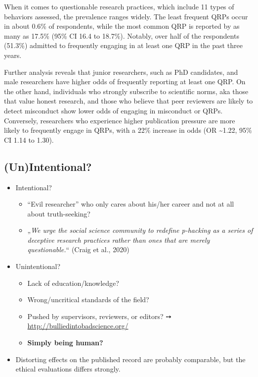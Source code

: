 \documentclass[
  letterpaper,
  DIV=11,
  numbers=noendperiod]{scrartcl}
\providecommand{\tightlist}{%
  \setlength{\itemsep}{0pt}\setlength{\parskip}{0pt}}
\begin{document}
When it comes to questionable research practices, which include 11 types
of behaviors assessed, the prevalence ranges widely. The least frequent
QRPs occur in about 0.6\% of respondents, while the most common QRP is
reported by as many as 17.5\% (95\% CI 16.4 to 18.7\%). Notably, over
half of the respondents (51.3\%) admitted to frequently engaging in at
least one QRP in the past three years.

Further analysis reveals that junior researchers, such as PhD
candidates, and male researchers have higher odds of frequently
reporting at least one QRP. On the other hand, individuals who strongly
subscribe to scientific norms, aka those that value honest research, and
those who believe that peer reviewers are likely to detect misconduct
show lower odds of engaging in misconduct or QRPs. Conversely,
researchers who experience higher publication pressure are more likely
to frequently engage in QRPs, with a 22\% increase in odds (OR
\textasciitilde1.22, 95\% CI 1.14 to 1.30).

\subsection{(Un)Intentional?}\label{unintentional}

\begin{itemize}
\tightlist
\item
  Intentional?

  \begin{itemize}
  \tightlist
  \item
    ``Evil researcher'' who only cares about his/her career and not at
    all about truth-seeking?
  \item
    „\emph{We urge the social science community to redefine p-hacking as
    a series of deceptive research practices rather than ones that are
    merely questionable.}`` (Craig et al., 2020)
  \end{itemize}
\item
  Unintentional?

  \begin{itemize}
  \tightlist
  \item
    Lack of education/knowledge?
  \item
    Wrong/uncritical standards of the field?
  \item
    Pushed by supervisors, reviewers, or editors? ➙
    \url{http://bulliedintobadscience.org/}
  \item
    \textbf{Simply being human?}
  \end{itemize}
\item
  Distorting effects on the published record are probably comparable,
  but the ethical evaluations differs strongly.
\end{itemize}
\end{document}
